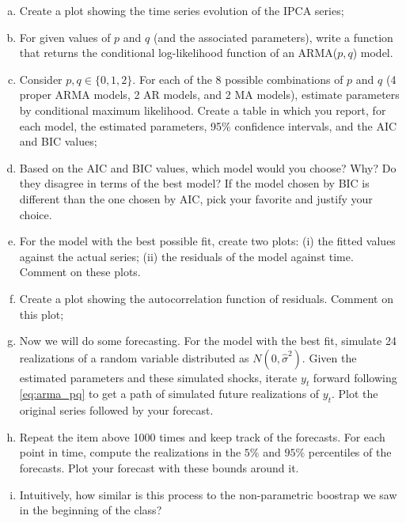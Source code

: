 \documentclass[11pt]{article}
\theoremstyle{definition}
\begin{document}
\begin{enumerate}[a)]
	\item Create a plot showing the time series evolution of the IPCA series;
	\item For given values of $p$ and $q$ (and the associated parameters), write a function that returns the conditional log-likelihood function of an ARMA($p,q$) model.
	\item Consider $p,q \in \{0,1,2\}$. For each of the 8 possible combinations of $p$ and $q$ (4 proper ARMA models, 2 AR models, and 2 MA models), estimate parameters by conditional maximum likelihood. Create a table in which you report, for each model, the estimated parameters, 95\% confidence intervals, and the AIC and BIC values;
	\item Based on the AIC and BIC values, which model would you choose? Why? Do they disagree in terms of the best model? If the model chosen by BIC is different than the one chosen by AIC, pick your favorite and justify your choice.
	\item For the model with the best possible fit, create two plots: (i) the fitted values against the actual series; (ii) the residuals of the model against time. Comment on these plots. 
	\item Create a plot showing the autocorrelation function of residuals. Comment on this plot;
	\item Now we will do some forecasting. For the model with the best fit, simulate 24 realizations of a random variable distributed as $N(0, \hat{\sigma}^2)$. Given the estimated parameters and these simulated shocks, iterate $y_t$ forward following \eqref{eq:arma_pq} to get a path of simulated future realizations of $y_t$. Plot the original series followed by your forecast.
	\item Repeat the item above 1000 times and keep track of the forecasts. For each point in time, compute the realizations in the $5\%$ and $95\%$ percentiles of the forecasts. Plot your forecast with these bounds around it.
	\item Intuitively, how similar is this process to the non-parametric boostrap we saw in the beginning of the class?
\end{enumerate}
\end{document}
